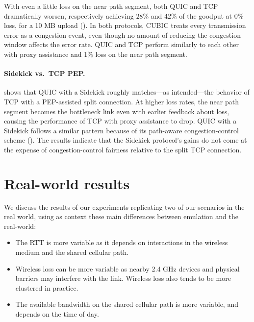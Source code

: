With even a little loss on the near path segment, both QUIC and TCP dramatically
worsen, respectively achieving $28\%$ and $42\%$ of the goodput at $0\%$ loss,
for a 10 MB upload ().
In both protocols, CUBIC treats every transmission error as a congestion event,
even though no amount of reducing the congestion window affects the error rate.
QUIC and TCP perform similarly to each other with proxy assistance and 1\%
loss on the near path segment.

\paragraph{Sidekick vs.\ TCP PEP\@.}
 shows that QUIC with a Sidekick roughly matches---as
 intended---the behavior of TCP with a PEP-assisted split connection. At higher
loss rates, the near path segment becomes the bottleneck link even with earlier
feedback about loss, causing the performance of TCP with proxy assistance to
drop. QUIC with a Sidekick follows a similar pattern because of its path-aware
congestion-control scheme (). The
results indicate that the Sidekick protocol's gains do not come at the expense
of congestion-control fairness relative to the split TCP connection.

\section{Real-world results}
\label{sec:sidekick:evaluation:real-world}



We discuss the results of our experiments replicating two of our scenarios in
the real world, using as context
these main differences between emulation and the real-world:

\begin{itemize}[noitemsep,topsep=0pt]
	\item The RTT is more variable as it depends on interactions in the
	wireless medium and the shared cellular path.
	\item Wireless loss can be more variable as nearby 2.4 GHz devices and
	physical barriers may interfere with the link. Wireless loss also tends
	to be more clustered in practice.
	\item The available bandwidth on the shared cellular path is more variable,
	and depends on the time of day.
\end{itemize}

